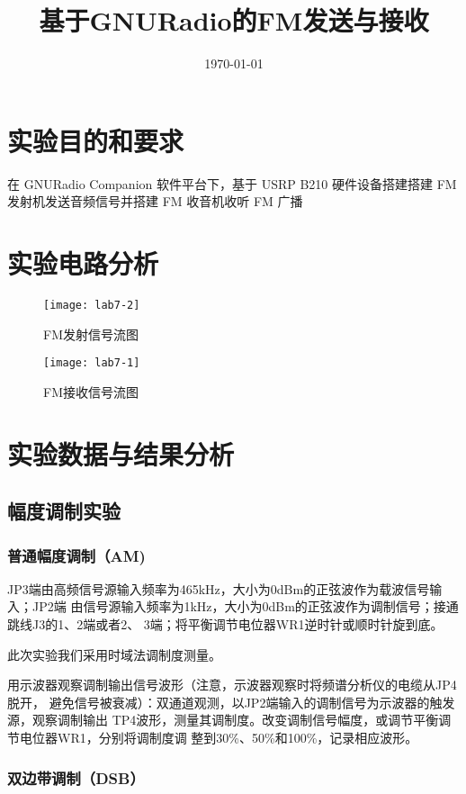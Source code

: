 \documentclass{../source/Experiment}
\title{基于GNURadio的FM发送与接收}
\date{\today}
\begin{document}
\section{实验目的和要求}

    在 GNURadio Companion 软件平台下，基于 USRP B210 硬件设备搭建搭建 FM 发射机发送音频信号并搭建 FM 收音机收听 FM 广播

    \section{实验电路分析}


    \begin{figure}[H]
        \centering
        \texttt{[image: lab7-2]}
        \caption{FM发射信号流图}
    \end{figure}
    
    \begin{figure}[H]
        \centering
        \texttt{[image: lab7-1]}
        \caption{FM接收信号流图}
    \end{figure}


    \section{实验数据与结果分析}
        \subsection{幅度调制实验}
            \subsubsection{普通幅度调制（AM)}
            JP3端由高频信号源输入频率为465kHz，大小为0dBm的正弦波作为载波信号输入；JP2端
            由信号源输入频率为1kHz，大小为0dBm的正弦波作为调制信号；接通跳线J3的1、2端或者2、
            3端；将平衡调节电位器WR1逆时针或顺时针旋到底。
            
            此次实验我们采用时域法调制度测量。

            用示波器观察调制输出信号波形（注意，示波器观察时将频谱分析仪的电缆从JP4脱开，
            避免信号被衰减）：双通道观测，以JP2端输入的调制信号为示波器的触发源，观察调制输出
            TP4波形，测量其调制度。改变调制信号幅度，或调节平衡调节电位器WR1，分别将调制度调
            整到30\%、50\%和100\%，记录相应波形。
            
            \subsubsection{双边带调制（DSB）}
\end{document}
